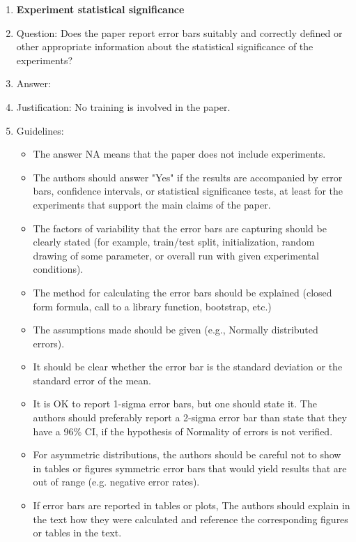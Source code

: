 \documentclass{article}
\begin{document}
\begin{enumerate}
\item {\bf Experiment statistical significance}
    \item[] Question: Does the paper report error bars suitably and correctly defined or other appropriate information about the statistical significance of the experiments?
    \item[] Answer: \answerNo{} %
    \item[] Justification: No training is involved in the paper.
    \item[] Guidelines:
    \begin{itemize}
        \item The answer NA means that the paper does not include experiments.
        \item The authors should answer "Yes" if the results are accompanied by error bars, confidence intervals, or statistical significance tests, at least for the experiments that support the main claims of the paper.
        \item The factors of variability that the error bars are capturing should be clearly stated (for example, train/test split, initialization, random drawing of some parameter, or overall run with given experimental conditions).
        \item The method for calculating the error bars should be explained (closed form formula, call to a library function, bootstrap, etc.)
        \item The assumptions made should be given (e.g., Normally distributed errors).
        \item It should be clear whether the error bar is the standard deviation or the standard error of the mean.
        \item It is OK to report 1-sigma error bars, but one should state it. The authors should preferably report a 2-sigma error bar than state that they have a 96\% CI, if the hypothesis of Normality of errors is not verified.
        \item For asymmetric distributions, the authors should be careful not to show in tables or figures symmetric error bars that would yield results that are out of range (e.g. negative error rates).
        \item If error bars are reported in tables or plots, The authors should explain in the text how they were calculated and reference the corresponding figures or tables in the text.
    \end{itemize}


\end{enumerate}
\end{document}
